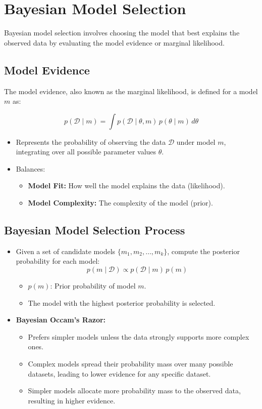 \section{Bayesian Model Selection}

Bayesian model selection involves choosing the model that best explains the observed data by evaluating the model evidence or marginal likelihood.

\subsection{Model Evidence}

The model evidence, also known as the marginal likelihood, is defined for a model $m$ as:

\[
p(\mathcal{D} \mid m) = \int p(\mathcal{D} \mid \theta, m) \, p(\theta \mid m) \, d\theta
\]

\begin{itemize}
    \item Represents the probability of observing the data $\mathcal{D}$ under model $m$, integrating over all possible parameter values $\theta$.
    \item Balances:
    \begin{itemize}
        \item \textbf{Model Fit:} How well the model explains the data (likelihood).
        \item \textbf{Model Complexity:} The complexity of the model (prior).
    \end{itemize}
\end{itemize}

\subsection{Bayesian Model Selection Process}

\begin{itemize}
    \item Given a set of candidate models $\{m_1, m_2, \ldots, m_k\}$, compute the posterior probability for each model:
    \[
    p(m \mid \mathcal{D}) \propto p(\mathcal{D} \mid m) \, p(m)
    \]
    \begin{itemize}
        \item $p(m)$: Prior probability of model $m$.
        \item The model with the highest posterior probability is selected.
    \end{itemize}
    \item \textbf{Bayesian Occam's Razor:}
    \begin{itemize}
        \item Prefers simpler models unless the data strongly supports more complex ones.
        \item Complex models spread their probability mass over many possible datasets, leading to lower evidence for any specific dataset.
        \item Simpler models allocate more probability mass to the observed data, resulting in higher evidence.
    \end{itemize}
\end{itemize}

